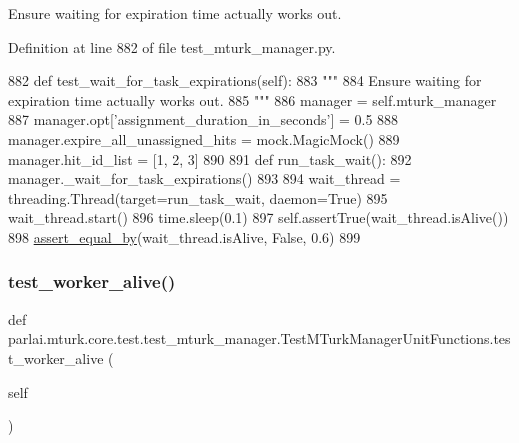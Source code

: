 \begin{DoxyVerb}Ensure waiting for expiration time actually works out.
\end{DoxyVerb}
 

Definition at line 882 of file test\+\_\+mturk\+\_\+manager.\+py.


\begin{DoxyCode}
882     \textcolor{keyword}{def }test\_wait\_for\_task\_expirations(self):
883         \textcolor{stringliteral}{"""}
884 \textcolor{stringliteral}{        Ensure waiting for expiration time actually works out.}
885 \textcolor{stringliteral}{        """}
886         manager = self.mturk\_manager
887         manager.opt[\textcolor{stringliteral}{'assignment\_duration\_in\_seconds'}] = 0.5
888         manager.expire\_all\_unassigned\_hits = mock.MagicMock()
889         manager.hit\_id\_list = [1, 2, 3]
890 
891         \textcolor{keyword}{def }run\_task\_wait():
892             manager.\_wait\_for\_task\_expirations()
893 
894         wait\_thread = threading.Thread(target=run\_task\_wait, daemon=\textcolor{keyword}{True})
895         wait\_thread.start()
896         time.sleep(0.1)
897         self.assertTrue(wait\_thread.isAlive())
898         \hyperlink{namespaceparlai_1_1mturk_1_1core_1_1test_1_1test__mturk__manager_a1fd7ac4fedefa65d2416601107dbe44c}{assert\_equal\_by}(wait\_thread.isAlive, \textcolor{keyword}{False}, 0.6)
899 
\end{DoxyCode}
\mbox{\label{classparlai_1_1mturk_1_1core_1_1test_1_1test__mturk__manager_1_1TestMTurkManagerUnitFunctions_a16cf4a9ae131a9c6bae2bcc07d804553}} 
\subsubsection{\texorpdfstring{test\+\_\+worker\+\_\+alive()}{test\_worker\_alive()}}
{\footnotesize\ttfamily def parlai.\+mturk.\+core.\+test.\+test\+\_\+mturk\+\_\+manager.\+Test\+M\+Turk\+Manager\+Unit\+Functions.\+test\+\_\+worker\+\_\+alive (\begin{DoxyParamCaption}\item[{}]{self }\end{DoxyParamCaption})}



